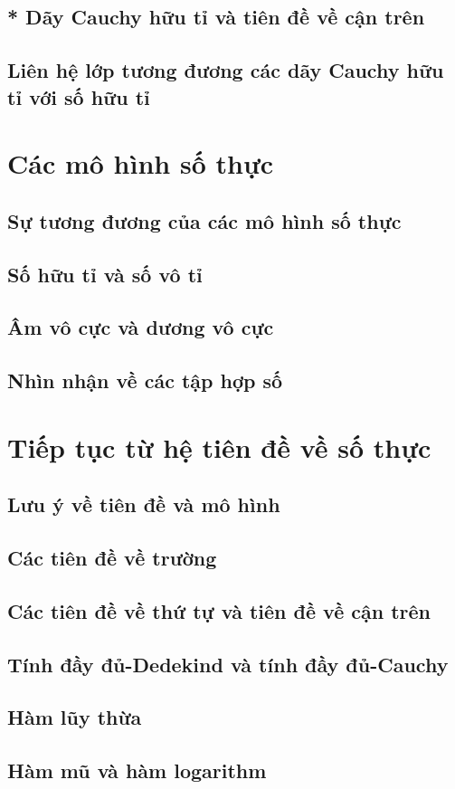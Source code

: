 \subsection{* Dãy Cauchy hữu tỉ và tiên đề về cận trên}

\subsection{Liên hệ lớp tương đương các dãy Cauchy hữu tỉ với số hữu tỉ}

\section{Các mô hình số thực}

\subsection{Sự tương đương của các mô hình số thực}

\subsection{Số hữu tỉ và số vô tỉ}

\subsection{Âm vô cực và dương vô cực}

\subsection{Nhìn nhận về các tập hợp số}

\section{Tiếp tục từ hệ tiên đề về số thực}

\subsection{Lưu ý về tiên đề và mô hình}

\subsection{Các tiên đề về trường}

\subsection{Các tiên đề về thứ tự và tiên đề về cận trên}

\subsection{Tính đầy đủ-Dedekind và tính đầy đủ-Cauchy}

\subsection{Hàm lũy thừa}

\subsection{Hàm mũ và hàm logarithm}


